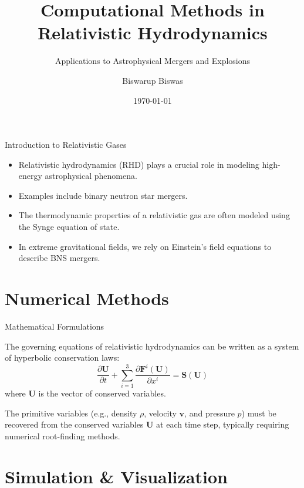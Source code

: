 \documentclass[aspectratio=169]{beamer}
\title{Computational Methods in Relativistic Hydrodynamics}
\subtitle{Applications to Astrophysical Mergers and Explosions}
\author[Biswas]{Biswarup Biswas}
\institute[MU]{Department of Mathematics, Mahindra University}
\date{\today}
\begin{document}
\begin{frame}[plain]
  \titlepage
\end{frame}

\begin{frame}{Introduction to Relativistic Gases}
  \begin{itemize}
    \item Relativistic hydrodynamics (RHD) plays a crucial role in modeling high-energy astrophysical phenomena.
    \item Examples include binary neutron star mergers.
    \item The thermodynamic properties of a relativistic gas are often modeled using the Synge equation of state.
    \item In extreme gravitational fields, we rely on Einstein's field equations to describe BNS mergers.
  \end{itemize}
\end{frame}

\section{Numerical Methods}

\begin{frame}{Mathematical Formulations}
  \begin{theorem}
    The governing equations of relativistic hydrodynamics can be written as a system of hyperbolic conservation laws:
    \[
      \frac{\partial \mathbf{U}}{\partial t} + \sum_{i=1}^3 \frac{\partial \mathbf{F}^i(\mathbf{U})}{\partial x^i} = \mathbf{S}(\mathbf{U})
    \]
    where $\mathbf{U}$ is the vector of conserved variables.
  \end{theorem}
  
  \begin{definition}
    The primitive variables (e.g., density $\rho$, velocity $\mathbf{v}$, and pressure $p$) must be recovered from the conserved variables $\mathbf{U}$ at each time step, typically requiring numerical root-finding methods.
  \end{definition}
\end{frame}

\section{Simulation \& Visualization}
\end{document}
